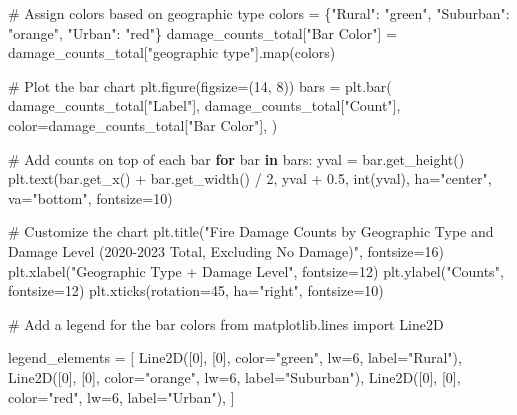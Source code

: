 \documentclass[
  letterpaper,
  DIV=11,
  numbers=noendperiod]{scrartcl}
\newenvironment{Shaded}{\begin{snugshade}}{\end{snugshade}}
\newcommand{\BuiltInTok}[1]{\textcolor[rgb]{0.00,0.23,0.31}{#1}}
\newcommand{\CommentTok}[1]{\textcolor[rgb]{0.37,0.37,0.37}{#1}}
\newcommand{\ControlFlowTok}[1]{\textcolor[rgb]{0.00,0.23,0.31}{\textbf{#1}}}
\newcommand{\DecValTok}[1]{\textcolor[rgb]{0.68,0.00,0.00}{#1}}
\newcommand{\FloatTok}[1]{\textcolor[rgb]{0.68,0.00,0.00}{#1}}
\newcommand{\ImportTok}[1]{\textcolor[rgb]{0.00,0.46,0.62}{#1}}
\newcommand{\KeywordTok}[1]{\textcolor[rgb]{0.00,0.23,0.31}{\textbf{#1}}}
\newcommand{\NormalTok}[1]{\textcolor[rgb]{0.00,0.23,0.31}{#1}}
\newcommand{\OperatorTok}[1]{\textcolor[rgb]{0.37,0.37,0.37}{#1}}
\newcommand{\StringTok}[1]{\textcolor[rgb]{0.13,0.47,0.30}{#1}}
\begin{document}
\begin{Shaded}
\begin{Highlighting}[]
\CommentTok{\# Assign colors based on geographic type}
\NormalTok{colors }\OperatorTok{=}\NormalTok{ \{}\StringTok{"Rural"}\NormalTok{: }\StringTok{"green"}\NormalTok{, }\StringTok{"Suburban"}\NormalTok{: }\StringTok{"orange"}\NormalTok{, }\StringTok{"Urban"}\NormalTok{: }\StringTok{"red"}\NormalTok{\}}
\NormalTok{damage\_counts\_total[}\StringTok{"Bar Color"}\NormalTok{] }\OperatorTok{=}\NormalTok{ damage\_counts\_total[}\StringTok{"geographic type"}\NormalTok{].}\BuiltInTok{map}\NormalTok{(colors)}

\CommentTok{\# Plot the bar chart}
\NormalTok{plt.figure(figsize}\OperatorTok{=}\NormalTok{(}\DecValTok{14}\NormalTok{, }\DecValTok{8}\NormalTok{))}
\NormalTok{bars }\OperatorTok{=}\NormalTok{ plt.bar(}
\NormalTok{    damage\_counts\_total[}\StringTok{"Label"}\NormalTok{],}
\NormalTok{    damage\_counts\_total[}\StringTok{"Count"}\NormalTok{],}
\NormalTok{    color}\OperatorTok{=}\NormalTok{damage\_counts\_total[}\StringTok{"Bar Color"}\NormalTok{],}
\NormalTok{)}

\CommentTok{\# Add counts on top of each bar}
\ControlFlowTok{for}\NormalTok{ bar }\KeywordTok{in}\NormalTok{ bars:}
\NormalTok{    yval }\OperatorTok{=}\NormalTok{ bar.get\_height()}
\NormalTok{    plt.text(bar.get\_x() }\OperatorTok{+}\NormalTok{ bar.get\_width() }\OperatorTok{/} \DecValTok{2}\NormalTok{, yval }\OperatorTok{+} \FloatTok{0.5}\NormalTok{, }\BuiltInTok{int}\NormalTok{(yval), ha}\OperatorTok{=}\StringTok{"center"}\NormalTok{, va}\OperatorTok{=}\StringTok{"bottom"}\NormalTok{, fontsize}\OperatorTok{=}\DecValTok{10}\NormalTok{)}

\CommentTok{\# Customize the chart}
\NormalTok{plt.title(}\StringTok{"Fire Damage Counts by Geographic Type and Damage Level (2020{-}2023 Total, Excluding No Damage)"}\NormalTok{, fontsize}\OperatorTok{=}\DecValTok{16}\NormalTok{)}
\NormalTok{plt.xlabel(}\StringTok{"Geographic Type + Damage Level"}\NormalTok{, fontsize}\OperatorTok{=}\DecValTok{12}\NormalTok{)}
\NormalTok{plt.ylabel(}\StringTok{"Counts"}\NormalTok{, fontsize}\OperatorTok{=}\DecValTok{12}\NormalTok{)}
\NormalTok{plt.xticks(rotation}\OperatorTok{=}\DecValTok{45}\NormalTok{, ha}\OperatorTok{=}\StringTok{"right"}\NormalTok{, fontsize}\OperatorTok{=}\DecValTok{10}\NormalTok{)}

\CommentTok{\# Add a legend for the bar colors}
\ImportTok{from}\NormalTok{ matplotlib.lines }\ImportTok{import}\NormalTok{ Line2D}

\NormalTok{legend\_elements }\OperatorTok{=}\NormalTok{ [}
\NormalTok{    Line2D([}\DecValTok{0}\NormalTok{], [}\DecValTok{0}\NormalTok{], color}\OperatorTok{=}\StringTok{"green"}\NormalTok{, lw}\OperatorTok{=}\DecValTok{6}\NormalTok{, label}\OperatorTok{=}\StringTok{"Rural"}\NormalTok{),}
\NormalTok{    Line2D([}\DecValTok{0}\NormalTok{], [}\DecValTok{0}\NormalTok{], color}\OperatorTok{=}\StringTok{"orange"}\NormalTok{, lw}\OperatorTok{=}\DecValTok{6}\NormalTok{, label}\OperatorTok{=}\StringTok{"Suburban"}\NormalTok{),}
\NormalTok{    Line2D([}\DecValTok{0}\NormalTok{], [}\DecValTok{0}\NormalTok{], color}\OperatorTok{=}\StringTok{"red"}\NormalTok{, lw}\OperatorTok{=}\DecValTok{6}\NormalTok{, label}\OperatorTok{=}\StringTok{"Urban"}\NormalTok{),}
\NormalTok{]}


\end{Highlighting}
\end{Shaded}
\end{document}
